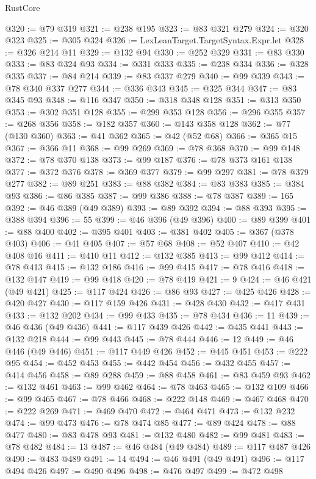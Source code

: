 \begin{lexlean}{RustCore}
\begin{coremodule}
@320 := @79 @319
@321 := @238 @195
@323 := @83 @321 @279
@324 := @320 @323
@325 := @305 @324
@326 := LexLeanTarget.TargetSyntax.Expr.let
@328 := @326 @214 @11
@329 := @132 @94
@330 := @252 @329
@331 := @83 @330
@333 := @83 @324 @93
@334 := @331 @333
@335 := @238 @334
@336 := @328 @335
@337 := @84 @214
@339 := @83 @337 @279
@340 := @99 @339
@343 := @78 @340 @337 @277
@344 := @336 @343
@345 := @325 @344
@347 := @83 @345 @93
@348 := @116 @347
@350 := @318 @348 @128
@351 := @313 @350
@353 := @302 @351 @128
@355 := @299 @353 @128
@356 := @296 @355
@357 := @268 @356
@358 := @182 @357
@360 := @143 @358 @128
@362 := @77 (@130 @360)
@363 := @41 @362
@365 := @42 (@52 @68)
@366 := @365 @15
@367 := @366 @11
@368 := @99 @269
@369 := @78 @368
@370 := @99 @148
@372 := @78 @370 @138
@373 := @99 @187
@376 := @78 @373 @161 @138
@377 := @372 @376
@378 := @369 @377
@379 := @99 @297
@381 := @78 @379 @277
@382 := @89 @251
@383 := @88 @382
@384 := @83 @383
@385 := @384 @93
@386 := @86 @385
@387 := @99 @386
@388 := @78 @387
@389 := 165
@392 := @46 @389 (@49 @389)
@393 := @89 @392
@394 := @88 @393
@395 := @388 @394
@396 := 55
@399 := @46 @396 (@49 @396)
@400 := @89 @399
@401 := @88 @400
@402 := @395 @401
@403 := @381 @402
@405 := @367 (@378 @403)
@406 := @41 @405
@407 := @57 @68
@408 := @52 @407
@410 := @42 @408 @16
@411 := @410 @11
@412 := @132 @385
@413 := @99 @412
@414 := @78 @413
@415 := @132 @186
@416 := @99 @415
@417 := @78 @416
@418 := @132 @147
@419 := @99 @418
@420 := @78 @419
@421 := 9
@424 := @46 @421 (@49 @421)
@425 := @117 @424
@426 := @86 @93
@427 := @425 @426
@428 := @420 @427
@430 := @117 @159 @426
@431 := @428 @430
@432 := @417 @431
@433 := @132 @202
@434 := @99 @433
@435 := @78 @434
@436 := 11
@439 := @46 @436 (@49 @436)
@441 := @117 @439 @426
@442 := @435 @441
@443 := @132 @218
@444 := @99 @443
@445 := @78 @444
@446 := 12
@449 := @46 @446 (@49 @446)
@451 := @117 @449 @426
@452 := @445 @451
@453 := @222 @95
@454 := @452 @453
@455 := @442 @454
@456 := @432 @455
@457 := @414 @456
@458 := @89 @288
@459 := @88 @458
@461 := @83 @459 @93
@462 := @132 @461
@463 := @99 @462
@464 := @78 @463
@465 := @132 @109
@466 := @99 @465
@467 := @78 @466
@468 := @222 @148
@469 := @467 @468
@470 := @222 @269
@471 := @469 @470
@472 := @464 @471
@473 := @132 @232
@474 := @99 @473
@476 := @78 @474 @85
@477 := @89 @424
@478 := @88 @477
@480 := @83 @478 @93
@481 := @132 @480
@482 := @99 @481
@483 := @78 @482
@484 := 13
@487 := @46 @484 (@49 @484)
@489 := @117 @487 @426
@490 := @483 @489
@491 := 14
@494 := @46 @491 (@49 @491)
@496 := @117 @494 @426
@497 := @490 @496
@498 := @476 @497
@499 := @472 @498

\end{coremodule}
\end{lexlean}
